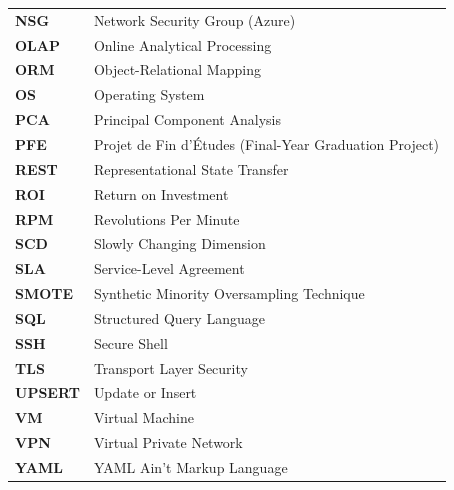 \begin{tabular}{p{3cm}p{11cm}}
\textbf{NSG}      & Network Security Group (Azure) \\
\textbf{OLAP}     & Online Analytical Processing \\
\textbf{ORM}      & Object-Relational Mapping \\
\textbf{OS}       & Operating System \\
\textbf{PCA}      & Principal Component Analysis \\
\textbf{PFE}      & Projet de Fin d'Études (Final-Year Graduation Project) \\
\textbf{REST}     & Representational State Transfer \\
\textbf{ROI}      & Return on Investment \\
\textbf{RPM}      & Revolutions Per Minute \\
\textbf{SCD}      & Slowly Changing Dimension \\
\textbf{SLA}      & Service-Level Agreement \\
\textbf{SMOTE}    & Synthetic Minority Oversampling Technique \\
\textbf{SQL}      & Structured Query Language \\
\textbf{SSH}      & Secure Shell \\
\textbf{TLS}      & Transport Layer Security \\
\textbf{UPSERT}   & Update or Insert \\
\textbf{VM}       & Virtual Machine \\
\textbf{VPN}      & Virtual Private Network \\
\textbf{YAML}     & YAML Ain't Markup Language \\
\end{tabular}

\cleardoublepage
